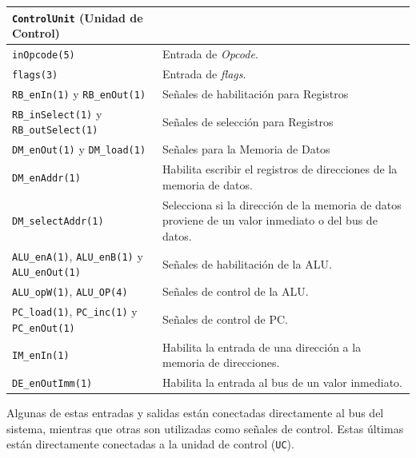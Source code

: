 \documentclass[a4paper,11pt]{article}
\begin{document}
\begin{center}
\begin{tabular}{p{6.4cm}|p{8.2cm}}
\texttt{ControlUnit} (Unidad de Control) &  \\%
\hline
\texttt{inOpcode(5)}                                                 & Entrada de \emph{Opcode}.\\
\texttt{flags(3)}                                                    & Entrada de \emph{flags}.\\
\texttt{RB\_enIn(1)} y \texttt{RB\_enOut(1)}                         & Señales de habilitación para Registros\\
\texttt{RB\_inSelect(1)} y \texttt{RB\_outSelect(1)}                 & Señales de selección para Registros\\
\texttt{DM\_enOut(1)} y \texttt{DM\_load(1)}                         & Señales para la Memoria de Datos\\
\texttt{DM\_enAddr(1)}                                               & Habilita escribir el registros de direcciones de la memoria de datos.\\
\texttt{DM\_selectAddr(1)}                                           & Selecciona si la dirección de la memoria de datos proviene de un valor inmediato o del bus de datos.\\
\texttt{ALU\_enA(1)}, \texttt{ALU\_enB(1)} y \texttt{ALU\_enOut(1)}  & Señales de habilitación de la ALU.\\
\texttt{ALU\_opW(1)}, \texttt{ALU\_OP(4)}                            & Señales de control de la ALU.\\
\texttt{PC\_load(1)}, \texttt{PC\_inc(1)} y \texttt{PC\_enOut(1)}    & Señales de control de PC.\\
\texttt{IM\_enIn(1)}                                                 & Habilita la entrada de una dirección a la memoria de direcciones.\\
\texttt{DE\_enOutImm(1)}                                             & Habilita la entrada al bus de un valor inmediato.\\
\end{tabular}
\end{center}

\normalsize

Algunas de estas entradas y salidas están conectadas directamente al bus del sistema, mientras que otras son utilizadas como señales de control.
Estas últimas están directamente conectadas a la unidad de control (\texttt{UC}).
\end{document}

